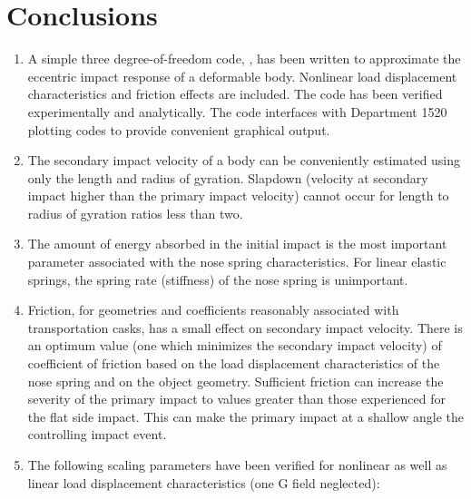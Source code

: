 \chapter{Conclusions}
\begin{enumerate}
\item {A simple three degree-of-freedom code, \SLAP ,
has been written to approximate the eccentric impact response 
of a deformable body.  
Nonlinear load 
displacement characteristics and friction effects are included.  The 
code has been verified experimentally and analytically.  The code 
interfaces with Department
1520 plotting codes to provide convenient 
graphical output.}

\item {The secondary impact velocity of a body 
can be conveniently estimated using only the length
and radius of gyration.  Slapdown (velocity at secondary impact higher
than the primary impact velocity) cannot occur for length to radius of
gyration ratios less than two.}

\item {The amount of energy absorbed in the initial impact is the most 
important parameter associated with the nose spring characteristics.  
For linear elastic springs, the
spring rate (stiffness) of the nose spring is unimportant.}

\item {Friction, for geometries and coefficients reasonably associated
with transportation casks, has a small effect on secondary impact
velocity.  There is an optimum value (one which minimizes the
secondary impact velocity) of coefficient of friction based on the
load displacement characteristics of the nose spring and on the object
geometry.  Sufficient
friction can increase the severity of the
primary impact 
to values greater than those 
experienced for the flat side impact.  This can make the 
primary impact at a shallow angle the controlling impact event.}

\item {The following scaling parameters have been verified for nonlinear
as well as linear load displacement characteristics (one G field
neglected):}
\end{enumerate}
